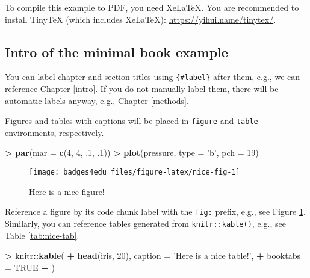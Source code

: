 \documentclass[]{book}
\newenvironment{Shaded}{\begin{snugshade}}{\end{snugshade}}
\newcommand{\KeywordTok}[1]{\textcolor[rgb]{0.13,0.29,0.53}{\textbf{#1}}}
\newcommand{\DataTypeTok}[1]{\textcolor[rgb]{0.13,0.29,0.53}{#1}}
\newcommand{\DecValTok}[1]{\textcolor[rgb]{0.00,0.00,0.81}{#1}}
\newcommand{\StringTok}[1]{\textcolor[rgb]{0.31,0.60,0.02}{#1}}
\newcommand{\OtherTok}[1]{\textcolor[rgb]{0.56,0.35,0.01}{#1}}
\newcommand{\OperatorTok}[1]{\textcolor[rgb]{0.81,0.36,0.00}{\textbf{#1}}}
\newcommand{\NormalTok}[1]{#1}
\theoremstyle{definition}
\theoremstyle{definition}
\theoremstyle{definition}
\theoremstyle{remark}
\begin{document}
To compile this example to PDF, you need XeLaTeX. You are recommended to
install TinyTeX (which includes XeLaTeX):
\url{https://yihui.name/tinytex/}.

\subsection{Intro of the minimal book
example}\label{intro-of-the-minimal-book-example}

You can label chapter and section titles using \texttt{\{\#label\}}
after them, e.g., we can reference Chapter \ref{intro}. If you do not
manually label them, there will be automatic labels anyway, e.g.,
Chapter \ref{methods}.

Figures and tables with captions will be placed in \texttt{figure} and
\texttt{table} environments, respectively.

\begin{Shaded}
\begin{Highlighting}[]
\OperatorTok{>}\StringTok{ }\KeywordTok{par}\NormalTok{(}\DataTypeTok{mar =} \KeywordTok{c}\NormalTok{(}\DecValTok{4}\NormalTok{, }\DecValTok{4}\NormalTok{, .}\DecValTok{1}\NormalTok{, .}\DecValTok{1}\NormalTok{))}
\OperatorTok{>}\StringTok{ }\KeywordTok{plot}\NormalTok{(pressure, }\DataTypeTok{type =} \StringTok{'b'}\NormalTok{, }\DataTypeTok{pch =} \DecValTok{19}\NormalTok{)}
\end{Highlighting}
\end{Shaded}

\begin{figure}

{\centering \texttt{[image: badges4edu\_files/figure-latex/nice-fig-1]} 

}

\caption{Here is a nice figure!}\label{fig:nice-fig}
\end{figure}

Reference a figure by its code chunk label with the \texttt{fig:}
prefix, e.g., see Figure \ref{fig:nice-fig}. Similarly, you can
reference tables generated from \texttt{knitr::kable()}, e.g., see Table
\ref{tab:nice-tab}.

\begin{Shaded}
\begin{Highlighting}[]
\OperatorTok{>}\StringTok{ }\NormalTok{knitr}\OperatorTok{::}\KeywordTok{kable}\NormalTok{(}
\OperatorTok{+}\StringTok{   }\KeywordTok{head}\NormalTok{(iris, }\DecValTok{20}\NormalTok{), }\DataTypeTok{caption =} \StringTok{'Here is a nice table!'}\NormalTok{,}
\OperatorTok{+}\StringTok{   }\DataTypeTok{booktabs =} \OtherTok{TRUE}
\OperatorTok{+}\StringTok{ }\NormalTok{)}
\end{Highlighting}
\end{Shaded}
\end{document}
